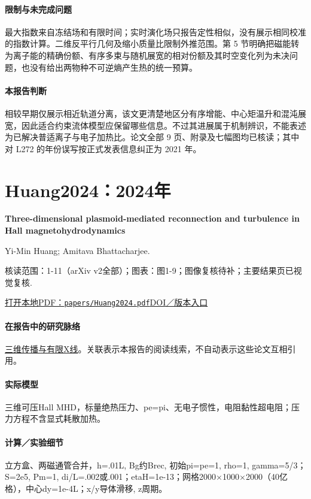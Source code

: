 \documentclass[UTF8,a4paper,11pt,openany,fontset=fandol]{ctexbook}
\begin{document}
\paragraph{限制与未完成问题}最大指数来自冻结场和有限时间；实时演化场只报告定性相似，没有展示相同校准的指数计算。二维反平行几何及缩小质量比限制外推范围。第 5 节明确把磁能转为离子能的精确份额、有序多束与随机展宽的相对份额及其时空变化列为未决问题，也没有给出两物种不可逆熵产生热的统一预算。

\paragraph{本报告判断}相较早期仅展示相近轨道分离，该文更清楚地区分有序增能、中心矩温升和混沌展宽，因此适合约束流体模型应保留哪些信息。不过其进展属于机制辨识，不能表述为已解决普适离子与电子加热比。论文全部 9 页、附录及七幅图均已核读；其中对 L272 的年份误写按正式发表信息纠正为 2021 年。

\section{Huang2024：2024年}\label{paper:Huang2024}

\textbf{Three-dimensional plasmoid-mediated reconnection and turbulence in Hall magnetohydrodynamics}\citep{Huang2024}\

Yi-Min Huang;  Amitava Bhattacharjee.

\textsf{核读范围：}1-11（arXiv v2全部）；\textsf{图表：}图1-9；图像复核待补；主要结果页已视觉复核.

\href{run:../papers/Huang2024.pdf}{打开本地PDF：\texttt{papers/Huang2024.pdf}}\quad\href{https://doi.org/10.1063/5.0216561}{DOI／版本入口}

\paragraph{在报告中的研究脉络}\hyperref[story:three]{三维传播与有限X线}。关联表示本报告的阅读线索，不自动表示这些论文互相引用。

\paragraph{实际模型}三维可压Hall MHD，标量绝热压力、pe=pi、无电子惯性，电阻黏性超电阻；压力方程不含显式耗散加热。

\paragraph{计算／实验细节}立方盒、两磁通管合并，h=.01L, Bg约Brec, 初始pi=pe=1, rho=1, gamma=5/3；S=2e5, Pm=1, di/L=.002或.001；etaH=1e-13；网格2000×1000×2000（40亿格），中心dy=1e-4L；x/y导体滑移, z周期。
\end{document}

